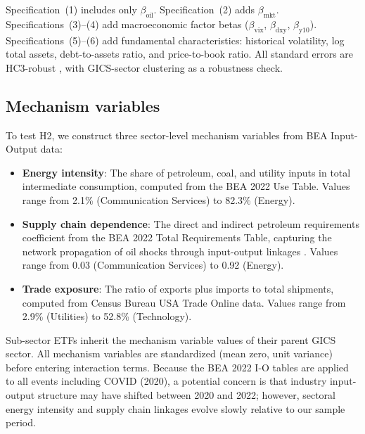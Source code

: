 \documentclass[12pt,preprint,authoryear]{elsarticle}
\begin{document}
Specification~(1) includes only $\beta_{\text{oil}}$. Specification~(2) adds $\beta_{\text{mkt}}$. Specifications~(3)--(4) add macroeconomic factor betas ($\beta_{\text{vix}}$, $\beta_{\text{dxy}}$, $\beta_{\text{y10}}$). Specifications~(5)--(6) add fundamental characteristics: historical volatility, log total assets, debt-to-assets ratio, and price-to-book ratio. All standard errors are HC3-robust \citep{long2000using}, with GICS-sector clustering \citep{cameron2011robust} as a robustness check.

\subsection{Mechanism variables}
To test H2, we construct three sector-level mechanism variables from BEA Input-Output data:

\begin{itemize}
    \item \textbf{Energy intensity}: The share of petroleum, coal, and utility inputs in total intermediate consumption, computed from the BEA 2022 Use Table. Values range from 2.1\% (Communication Services) to 82.3\% (Energy).
    \item \textbf{Supply chain dependence}: The direct and indirect petroleum requirements coefficient from the BEA 2022 Total Requirements Table, capturing the network propagation of oil shocks through input-output linkages \citep{acemoglu2012network,barrot2016input}. Values range from 0.03 (Communication Services) to 0.92 (Energy).
    \item \textbf{Trade exposure}: The ratio of exports plus imports to total shipments, computed from Census Bureau USA Trade Online data. Values range from 2.9\% (Utilities) to 52.8\% (Technology).
\end{itemize}

Sub-sector ETFs inherit the mechanism variable values of their parent GICS sector. All mechanism variables are standardized (mean zero, unit variance) before entering interaction terms. Because the BEA 2022 I-O tables are applied to all events including COVID (2020), a potential concern is that industry input-output structure may have shifted between 2020 and 2022; however, sectoral energy intensity and supply chain linkages evolve slowly relative to our sample period.
\end{document}
